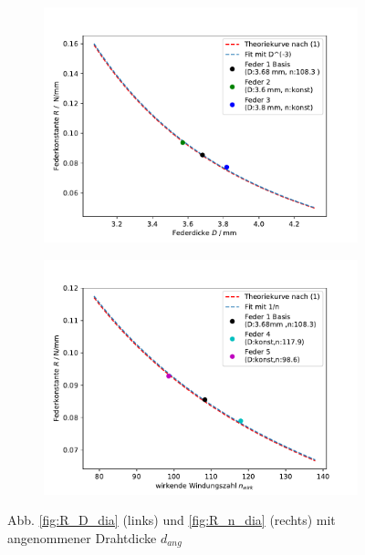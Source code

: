 \begin{figure}
    \begin{subfigure}[c]{0.5\textwidth}
        \includegraphics[width=\textwidth]{plots/opt_dicke_konstante_dia.pdf}
    \end{subfigure}
    \begin{subfigure}[c]{0.5\textwidth}
        \includegraphics[width=\textwidth]{plots/opt_n_konstante_dia.pdf}
    \end{subfigure}
    \caption{Abb. \ref{fig:R_D_dia} (links) und \ref{fig:R_n_dia} (rechts) mit angenommener Drahtdicke $d_{ang}$}
\end{figure}

\newpage
\label{sec:aussagekraft}
